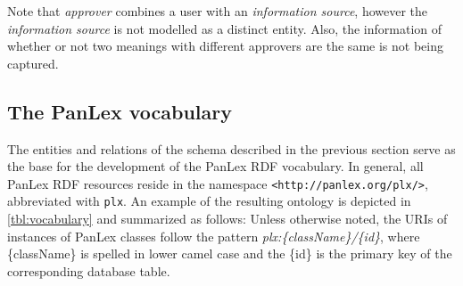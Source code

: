 \documentclass[sw]{iosart2c}
\newcommand*{\origtodo}{}
\let\origtodo\todo
\renewcommand*{\todo}{\origtodo[inline]}
\begin{document}

Note that \emph{approver} combines a user with an \emph{information source},
however the \emph{information source} is not modelled as a distinct entity.
Also, the information of whether or not two meanings with different approvers
are the same is not being captured. 








\subsection{The PanLex vocabulary}
\label{sec:vocabulary}
The entities and relations of the schema described in the previous section
serve as the base for the development of the PanLex RDF vocabulary.
In general, all PanLex RDF resources reside
in the namespace \texttt{<http://panlex.org/plx/>}, abbreviated with \texttt{plx}.
An example of the resulting ontology is depicted in \autoref{tbl:vocabulary} and
summarized as follows:
Unless otherwise noted, the URIs of instances of PanLex classes follow the pattern
\emph{plx:\{className\}/\{id\}}, where \{className\} is spelled in lower camel case
and the \{id\} is the primary key of the corresponding database table.
\end{document}

